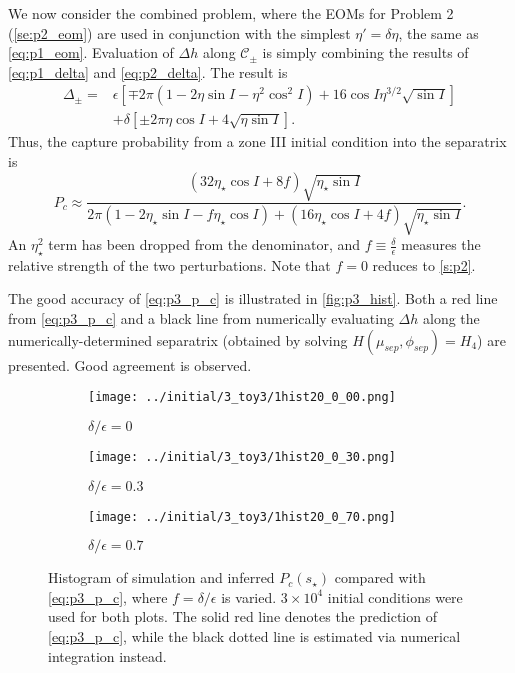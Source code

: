 \documentclass[
        fleqn,
        usenatbib,
    ]{mnras}
\newcommand*{\p}[1]{\left(#1\right)}
\newcommand*{\s}[1]{\left[#1\right]}
\begin{document}
We now consider the combined problem, where the EOMs for Problem 2
(\autoref{se:p2_eom}) are used in conjunction with the simplest $\eta' = \delta
\eta$, the same as \autoref{eq:p1_eom}. Evaluation of $\Delta h$ along
$\mathcal{C}_{\pm}$ is simply combining the results of \autoref{eq:p1_delta} and
\autoref{eq:p2_delta}. The result is
\begin{align}
    \Delta_{\pm} ={}& \epsilon\s{
        \mp 2\pi \p{1 - 2\eta \sin I - \eta^2 \cos^2 I}
            + 16\cos I\eta^{3/2}\sqrt{\sin I}}\nonumber\\
        &+ \delta \s{\pm 2\pi \eta \cos I + 4\sqrt{\eta \sin I}}.
\end{align}
Thus, the capture probability from a zone III initial condition into the
separatrix is
\begin{equation}
    P_c \approx \frac{\p{32 \eta_\star \cos I + 8f}\sqrt{\eta_\star \sin I}}{
        2\pi\p{1 - 2\eta_{\star}\sin I - f\eta_\star \cos I}
            + \p{16\eta_\star\cos I + 4f} \sqrt{\eta_\star\sin I}}.
            \label{eq:p3_p_c}
\end{equation}
An $\eta_\star^2$ term has been dropped from the denominator, and $f \equiv
\frac{\delta}{\epsilon}$ measures the relative strength of the two
perturbations. Note that $f = 0$ reduces to \autoref{s:p2}.

The good accuracy of \autoref{eq:p3_p_c} is illustrated in
\autoref{fig:p3_hist}. Both a red line from \autoref{eq:p3_p_c} and a black line
from numerically evaluating $\Delta h$ along the numerically-determined
separatrix (obtained by solving $H(\mu_{sep}, \phi_{sep}) = H_4$) are presented.
Good agreement is observed.
\begin{figure}
    \centering
    \begin{subfigure}{\columnwidth}
        \centering
        \texttt{[image: ../initial/3\_toy3/1hist20\_0\_00.png]}
        \caption{$\delta/\epsilon = 0$}
    \end{subfigure}

    \begin{subfigure}{\columnwidth}
        \centering
        \texttt{[image: ../initial/3\_toy3/1hist20\_0\_30.png]}
        \caption{$\delta/\epsilon = 0.3$}
    \end{subfigure}

    \begin{subfigure}{\columnwidth}
        \centering
        \texttt{[image: ../initial/3\_toy3/1hist20\_0\_70.png]}
        \caption{$\delta/\epsilon = 0.7$}
    \end{subfigure}
    \caption{Histogram of simulation and inferred $P_c(s_\star)$ compared with
    \autoref{eq:p3_p_c}, where $f = \delta/\epsilon$ is varied. $3 \times 10^4$
    initial conditions were used for both plots. The solid red line denotes the
    prediction of \autoref{eq:p3_p_c}, while the black dotted line is estimated
    via numerical integration instead.}\label{fig:p3_hist}
\end{figure}
\end{document}
